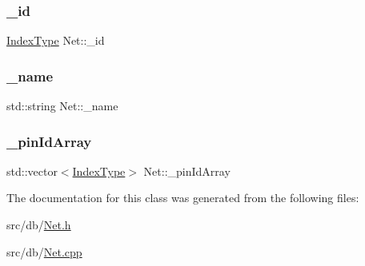 \subsubsection{\texorpdfstring{\+\_\+id}{\_id}}
{\footnotesize\ttfamily \hyperlink{type_8h_a581e8093e28e7362f2b6937296190676}{Index\+Type} Net\+::\+\_\+id\hspace{0.3cm}{\ttfamily [private]}}

\mbox{\label{classNet_a29e9f56c4c3827fdf1ee8625216afdd5}} 
\subsubsection{\texorpdfstring{\+\_\+name}{\_name}}
{\footnotesize\ttfamily std\+::string Net\+::\+\_\+name\hspace{0.3cm}{\ttfamily [private]}}

\mbox{\label{classNet_a0cf0ec3b779c2e24af461231d324c998}} 
\subsubsection{\texorpdfstring{\+\_\+pin\+Id\+Array}{\_pinIdArray}}
{\footnotesize\ttfamily std\+::vector$<$\hyperlink{type_8h_a581e8093e28e7362f2b6937296190676}{Index\+Type}$>$ Net\+::\+\_\+pin\+Id\+Array\hspace{0.3cm}{\ttfamily [private]}}



The documentation for this class was generated from the following files\+:\begin{DoxyCompactItemize}
\item 
src/db/\hyperlink{Net_8h}{Net.\+h}\item 
src/db/\hyperlink{Net_8cpp}{Net.\+cpp}\end{DoxyCompactItemize}
